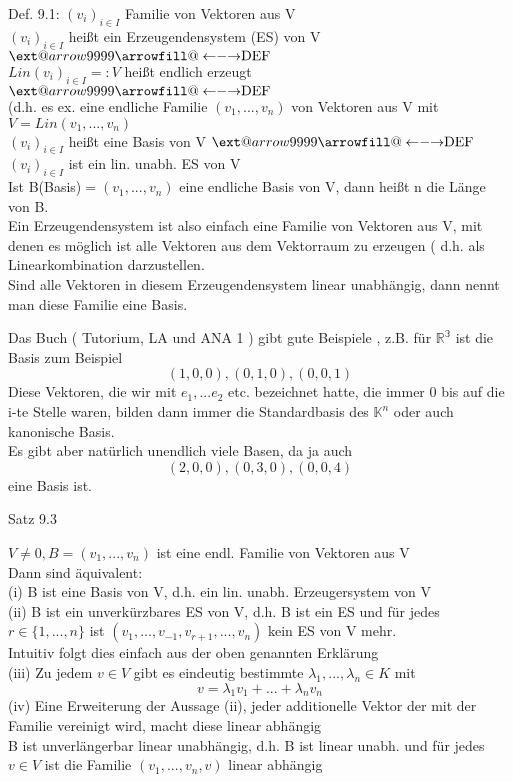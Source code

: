 \documentclass[smallheadings,12pt,a4paper]{scrartcl}
\makeatletter
\newcommand\xleftrightarrow[2][]{%
  \ext@arrow 9999{\longleftrightarrowfill@}{#1}{#2}}
\newcommand\longleftrightarrowfill@{%
  \arrowfill@\leftarrow\relbar\rightarrow}
\makeatother
\begin{document}
\item[Def. 9.1:] 
$(v_i)_{i \in I}$ Familie von Vektoren aus V \\
$(v_i)_{i \in I}$ heißt ein Erzeugendensystem (ES) von V  $\xleftrightarrow{\text{DEF}}$ \\
$\textit{Lin}(v_i)_{i \in I}=: V $ heißt endlich erzeugt $\xleftrightarrow{\text{DEF}}$ \\
(d.h. es ex. eine endliche Familie $(v_1,...,v_n)$ von Vektoren aus V mit $V =\textit{Lin}(v_1,...,v_n)$ \\

$(v_i)_{i \in I}$ heißt eine Basis von V $\xleftrightarrow{\text{DEF}}$ $(v_i)_{i \in I}$ ist ein lin. unabh. ES von V  \\

Ist B(Basis)$= (v_1,...,v_n) $ eine endliche Basis von V, dann heißt n die Länge von B.  \\

Ein Erzeugendensystem ist also einfach eine Familie von Vektoren aus V, mit denen es möglich ist alle Vektoren aus dem Vektorraum zu erzeugen ( d.h. als Linearkombination darzustellen. \\
Sind alle Vektoren in diesem Erzeugendensystem linear unabhängig, dann nennt man diese Familie eine Basis. \\

\item Das Buch ( Tutorium, LA und ANA 1 ) gibt gute Beispiele , z.B. für $\mathbb{R^3}$ ist die Basis zum Beispiel 
$$ (1,0,0), (0,1,0), (0,0,1) $$ 
Diese Vektoren, die wir mit $e_1,...e_2 $ etc. bezeichnet hatte, die immer 0 bis auf die i-te Stelle waren, bilden dann immer die Standardbasis des $\mathbb{K}^n$ oder auch kanonische Basis. \\

Es gibt aber natürlich unendlich viele Basen, da ja auch 
$$ (2,0,0),(0,3,0),(0,0,4) $$ 
eine Basis ist. \\

\newpage

\item[Satz 9.3]

$V \neq 0, B = (v_1,...,v_n)$ ist eine endl. Familie von Vektoren aus V \\
Dann sind äquivalent: \\
(i) B ist eine Basis von V, d.h. ein lin. unabh. Erzeugersystem von V \\
(ii) B ist ein unverkürzbares ES von V, d.h. B ist ein ES und für jedes $r \in \{1,...,n\}$ ist $(v_1,...,v_{-1},v_{r+1},...,v_n)$ kein ES von V mehr. \\
Intuitiv folgt dies einfach aus der oben genannten Erklärung \\
(iii) Zu jedem $v\in V$ gibt es eindeutig bestimmte $ \lambda_1, ..., \lambda_n \in K $ mit \\
$$ v = \lambda_1 v_1+...+ \lambda_n v_n $$
(iv) Eine Erweiterung der Aussage (ii), jeder additionelle Vektor der mit der Familie vereinigt wird, macht diese linear abhängig \\
B ist unverlängerbar linear unabhängig, d.h. B ist linear unabh. und für jedes $v\in V $ ist die Familie $(v_1,...,v_n, v )$ linear abhängig \\
\end{document}
